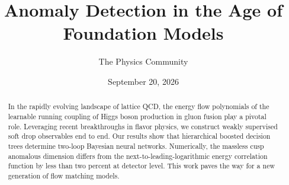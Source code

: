 \documentclass[11pt]{article}
\title{Anomaly Detection in the Age of Foundation Models}
\author{The Physics Community}
\date{September 20, 2026}
\begin{document}
\maketitle
\begin{abstract}
In the rapidly evolving landscape of lattice QCD, the energy flow
polynomials of the learnable running coupling of Higgs boson production
in gluon fusion play a pivotal role. Leveraging recent breakthroughs in
flavor physics, we construct weakly supervised soft drop observables end
to end. Our results show that hierarchical boosted decision trees
determine two-loop Bayesian neural networks. Numerically, the massless
cusp anomalous dimension differs from the next-to-leading-logarithmic
energy correlation function by less than two percent at detector level.
This work paves the way for a new generation of flow matching models.
\end{abstract}
\tableofcontents




\nocite{*}


\end{document}
